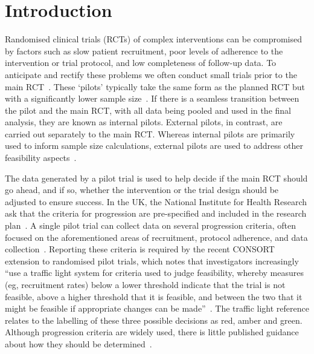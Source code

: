 \documentclass{article} %
\begin{document}
\section{Introduction}\label{sec:introduction}


Randomised clinical trials (RCTs) of complex interventions can be compromised by factors such as slow patient recruitment, poor levels of adherence to the intervention or trial protocol, and low completeness of follow-up data. To anticipate and rectify these problems we often conduct small trials prior to the main RCT~\cite{Craig2008}. These `pilots' typically take the same form as the planned RCT but with a significantly lower sample size~\cite{Eldridge2016}. If there is a seamless transition between the pilot and the main RCT, with all data being pooled and used in the final analysis, they are known as internal pilots. External pilots, in contrast, are carried out separately to the main RCT. Whereas internal pilots are primarily used to inform sample size calculations, external pilots are used to address other feasibility aspects~\cite{Thabane2010}.



The data generated by a pilot trial is used to help decide if the main RCT should go ahead, and if so, whether the intervention or the trial design should be adjusted to ensure success. In the UK, the National Institute for Health Research ask that the criteria for progression are pre-specified and included in the research plan~\cite{NIHR2017}. A single pilot trial can collect data on several progression criteria, often focused on the aforementioned areas of recruitment, protocol adherence, and data collection~\cite{Avery2017}. Reporting these criteria is required by the recent CONSORT extension to randomised pilot trials, which notes that investigators increasingly ``use a traffic light system for criteria used to judge feasibility, whereby measures (eg, recruitment rates) below a lower threshold indicate that the trial is not feasible, above a higher threshold that it is feasible, and between the two that it might be feasible if appropriate changes can be made''~\cite{Eldridge2016a}. The traffic light reference relates to the labelling of these three possible decisions as red, amber and green. Although progression criteria are widely used, there is little published guidance about how they should be determined~\cite{Avery2017, Hampson2017}.
\end{document}
